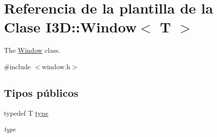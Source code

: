 \hypertarget{class_i3_d_1_1_window}{}\section{Referencia de la plantilla de la Clase I3D\+:\+:Window$<$ T $>$}
\label{class_i3_d_1_1_window}


The \hyperlink{class_i3_d_1_1_window}{Window} class.  




{\ttfamily \#include $<$window.\+h$>$}

\subsection*{Tipos públicos}
\begin{DoxyCompactItemize}
\item 
typedef T \hyperlink{class_i3_d_1_1_window_adf6b77f358cdb242b37574a88b9e59f3}{type}
\begin{DoxyCompactList}\small\item\em type \end{DoxyCompactList}\end{DoxyCompactItemize}
